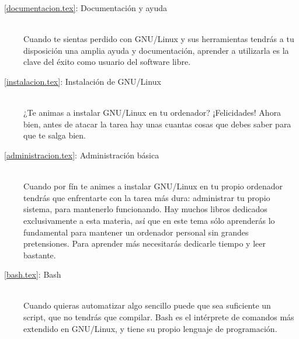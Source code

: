 \begin{description}

\item[\chaptername~\ref{documentacion.tex}: Documentación y ayuda] ~\\
Cuando te sientas  perdido con GNU/Linux y sus  herramientas tendrás a
tu disposición una amplia ayuda y documentación, aprender a utilizarla
es la clave del éxito como usuario del software libre.

\item[\chaptername~\ref{instalacion.tex}:  Instalación  de  GNU/Linux]
~\\ ¿Te  animas a  instalar GNU/Linux  en tu  ordenador? ¡Felicidades!
Ahora bien, antes de atacar la  tarea hay unas cuantas cosas que debes
saber para que te salga bien.

\item[\chaptername~\ref{administracion.tex}:   Administración  básica]
~\\  Cuando por  fín  te  animes a  instalar  GNU/Linux  en tu  propio
ordenador tendrás que  enfrentarte con la tarea  más dura: administrar
tu  propio sistema,  para  mantenerlo funcionando.  Hay muchos  libros
dedicados exclusivamente  a esta  materia, así que  en este  tema sólo
aprenderás  lo fundamental  para  mantener un  ordenador personal  sin
grandes pretensiones. Para aprender más necesitarás dedicarle tiempo y
leer bastante.

\item[\chaptername~\ref{bash.tex}:    Bash]    ~\\   Cuando    quieras
automatizar algo sencillo  puede que sea suficiente un  script, que no
tendrás que compilar. Bash es  el intérprete de comandos más extendido
en GNU/Linux, y tiene su propio lenguaje de programación.




\end{description}
